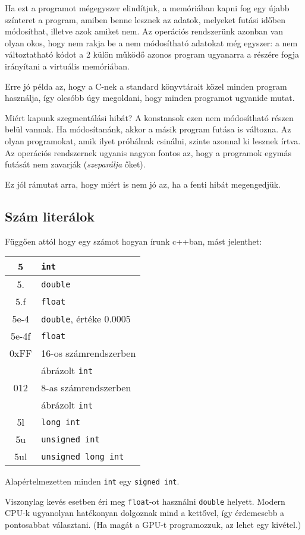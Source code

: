 \documentclass[a4paper,11.5pt,table]{article}
\begin{document}
	Ha ezt a programot mégegyszer elindítjuk, a memóriában kapni fog egy újabb színteret a program, amiben benne lesznek az adatok, melyeket futási időben módosíthat, illetve azok amiket nem. Az operációs rendszerünk azonban van olyan okos, hogy nem rakja be a nem módosítható adatokat még egyszer: a nem változtatható kódot a 2 külön működő azonos program ugyanarra a részére fogja irányítani a virtuális memóriában.
	
	\medskip
	Erre jó példa az, hogy a C-nek a standard könyvtárait közel minden program használja, így olcsóbb úgy megoldani, hogy minden programot ugyanide mutat.
	
	\medskip
	Miért kapunk szegmentálási hibát? A konstansok ezen nem módosítható részen belül vannak. Ha módosítanánk, akkor a másik program futása is változna. Az olyan programokat, amik ilyet próbálnak csinálni, szinte azonnal ki lesznek írtva. Az operációs rendszernek ugyanis nagyon fontos az, hogy a programok egymás futását nem zavarják (\textit{szeparálja} őket).
	
	\medskip
	Ez jól rámutat arra, hogy miért is nem jó az, ha a fenti hibát megengedjük.
	\subsection{Szám literálok} %
	Függően attól hogy egy számot hogyan írunk c++ban, mást jelenthet:
	\begin{center}
		\begin{tabular}{|c|l|}
			\hline
			5&\texttt{int}\\
			\hline
			5.&\texttt{double}\\
			\hline
			5.f&\texttt{float}\\
			\hline
			5e-4&\texttt{double}, értéke 0.0005\\
			\hline
			5e-4f&\texttt{float}\\
			\hline
			0xFF&{16-os számrendszerben}\\
			& ábrázolt \texttt{int}\\
			\hline
			012&{8-as számrendszerben}\\
			&ábrázolt \texttt{int}\\
			\hline
			5l&\texttt{long int}\\
			\hline
			5u&\texttt{unsigned int}\\
			\hline
			5ul&\texttt{unsigned long int}\\
			\hline
		\end{tabular}
		\end{center}
	\begin{note}
		Alapértelmezetten minden \texttt{int} egy \texttt{signed int}.
	\end{note}
	\begin{note}
		Viszonylag kevés esetben éri meg \texttt{float}-ot használni \texttt{double} helyett. Modern CPU-k ugyanolyan hatékonyan dolgoznak mind a kettővel, így érdemesebb a pontosabbat választani. (Ha magát a GPU-t programozzuk, az lehet egy kivétel.)
	\end{note}
	
\end{document}
